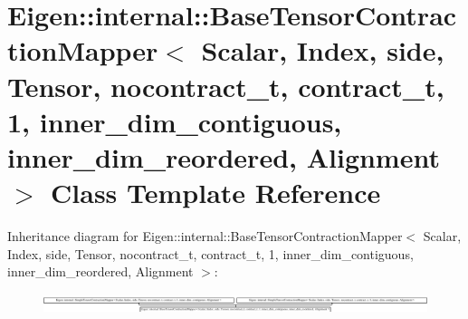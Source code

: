 \hypertarget{class_eigen_1_1internal_1_1_base_tensor_contraction_mapper_3_01_scalar_00_01_index_00_01side_00_080d560a1738baff9d26ac7a1ec9763b}{}\section{Eigen\+:\+:internal\+:\+:Base\+Tensor\+Contraction\+Mapper$<$ Scalar, Index, side, Tensor, nocontract\+\_\+t, contract\+\_\+t, 1, inner\+\_\+dim\+\_\+contiguous, inner\+\_\+dim\+\_\+reordered, Alignment $>$ Class Template Reference}
\label{class_eigen_1_1internal_1_1_base_tensor_contraction_mapper_3_01_scalar_00_01_index_00_01side_00_080d560a1738baff9d26ac7a1ec9763b}
Inheritance diagram for Eigen\+:\+:internal\+:\+:Base\+Tensor\+Contraction\+Mapper$<$ Scalar, Index, side, Tensor, nocontract\+\_\+t, contract\+\_\+t, 1, inner\+\_\+dim\+\_\+contiguous, inner\+\_\+dim\+\_\+reordered, Alignment $>$\+:\begin{figure}[H]
\begin{center}
\leavevmode
\includegraphics[height=0.591966cm]{class_eigen_1_1internal_1_1_base_tensor_contraction_mapper_3_01_scalar_00_01_index_00_01side_00_080d560a1738baff9d26ac7a1ec9763b}
\end{center}
\end{figure}
